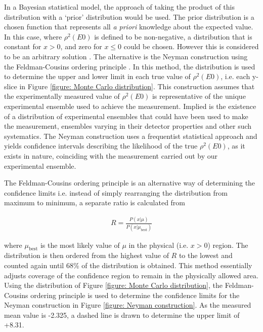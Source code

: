 In a Bayesian statistical model, the approach of taking the product of this distribution with a `prior' distribution would be used. The prior distribution is a chosen function that represents all \textit{a priori} knowledge about the expected value. In this case, where $\rho^2(E0)$ is defined to be non-negative, a distribution that is constant for $x>0$, and zero for $ x \leq 0$ could be chosen. However this is considered to be an arbitrary solution \cite{GregoryText}. The alternative is the Neyman construction using the Feldman-Cousins ordering principle \cite{JamesText}. In this method, the distribution is used to determine the upper and lower limit in each true value of $\rho^2(E0)$, i.e. each y-slice in Figure \ref{figure: Monte Carlo distribution}. This construction assumes that the experimentally measured value of $\rho^2(E0)$ is representative of the unique experimental ensemble used to achieve the measurement. Implied is the existence of a distribution of experimental ensembles that could have been used to make the measurement, ensembles varying in their detector properties and other such systematics. The Neyman construction uses a frequentist statistical approach and yields confidence intervals describing the likelihood of the true $\rho^2(E0)$, as it exists in nature, coinciding with the measurement carried out by our experimental ensemble.

The Feldman-Cousins ordering principle is an alternative way of determining the confidence limits i.e. instead of simply rearranging the distribution from maximum to minimum, a separate ratio is calculated from \cite{JamesText}

\begin{gather}
R = \frac{P(x\rvert \mu)}{P(x\rvert \mu_\mathrm{best})}
\label{eq:feldman cousins}
\end{gather}

where $\mu_\mathrm{best}$ is the most likely value of $\mu$ in the physical (i.e. $x > 0$) region. The distribution is then ordered from the highest value of $R$ to the lowest and counted again until 68\% of the distribution is obtained. This method essentially adjusts coverage of the confidence region to remain in the physically allowed area. Using the distribution of Figure \ref{figure: Monte Carlo distribution}, the Feldman-Cousins ordering principle is used to determine the confidence limits for the Neyman construction in Figure \ref{figure: Neyman construction}. As the measured mean value is -2.325, a dashed line is drawn to determine the upper limit of +8.31. 

